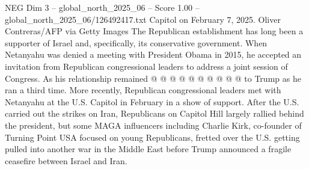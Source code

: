 \begin{textsample}{NEG Dim 3 – global\_north\_2025\_06 – Score 1.00 – global\_north\_2025\_06/126492417.txt}
Capitol on February 7, 2025.
Oliver Contreras/AFP via Getty Images The Republican establishment has long been a supporter of Israel and, specifically, its conservative government.
When Netanyahu was denied a meeting with President Obama in 2015, he accepted an invitation from Republican congressional leaders to address a joint session of Congress.
As his relationship remained @ @ @ @ @ @ @ @ @ @ to Trump as he ran a third time.
More recently, Republican congressional leaders met with Netanyahu at the U.S.
Capitol in February in a show of support.
After the U.S. carried out the strikes on Iran, Republicans on Capitol Hill largely rallied behind the president, but some MAGA influencers including Charlie Kirk, co-founder of Turning Point USA focused on young Republicans, fretted over the U.S. getting pulled into another war in the Middle East before Trump announced a fragile ceasefire between Israel and Iran.

\end{textsample}
